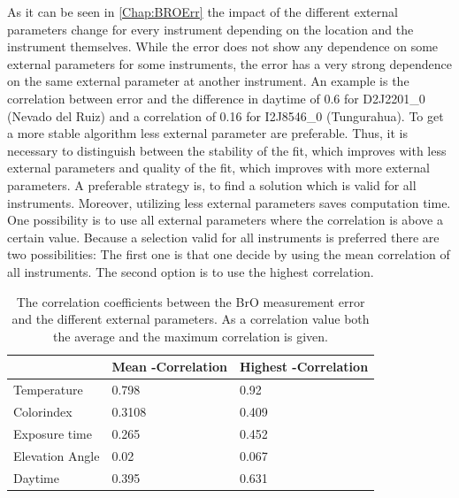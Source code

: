 \documentclass  [
  paper    = a4,
  BCOR     = 10mm,
  twoside,
  fontsize = 12pt,
  fleqn,
  toc      = bibnumbered,
  toc      = listofnumbered,
  numbers  = noendperiod,
  headings = normal,
  listof   = leveldown,
  version  = 3.03
]                                       {scrreprt}
\newcommand{\myrowcolour}{\rowcolor[gray]{0.925}}
\begin{document}
As it can be seen in \cref{Chap:BROErr} the impact of the different external parameters change for every instrument depending on the location and the instrument themselves. 
While the   error does not show any dependence on some external parameters for some instruments, the error has a very strong dependence on the same external parameter at another instrument. An example is the correlation between   error and the difference in daytime of 0.6 for D2J2201\_0 (Nevado del Ruiz) and a correlation of 0.16 for I2J8546\_0 (Tungurahua).
To get a more stable algorithm less external parameter are preferable. Thus, it is necessary to distinguish between the stability of the fit, which improves with less external parameters and quality of the fit, which improves with more external parameters. 
A preferable strategy is, to find a solution which is valid for all instruments. Moreover, utilizing less external parameters saves computation time.
One possibility is to use all external parameters where the correlation is above a certain value. Because a selection valid for all instruments is preferred there are two possibilities: The first one is that one decide by using the mean correlation of all instruments. The second option is to use the highest correlation.

\begin{table}[h!]
	\centering
	\caption{The correlation coefficients between the BrO measurement error and the different external parameters. As a correlation value both the average and the maximum correlation is given.}
	\begin{tabular}{p{4cm}p{3cm}p{3cm}}
		&  Mean -Correlation&  Highest   -Correlation\\
		\toprule
		Temperature &0.798&    0.92\\
		\myrowcolour%
		Colorindex &0.3108&    0.409\\
		Exposure time &0.265&    0.452\\
		\myrowcolour%
		Elevation Angle &0.02&    0.067\\
		Daytime &0.395&    0.631\\
		\bottomrule        
	\end{tabular}
	\label{tab:CorrEP}
\end{table}
\end{document}
